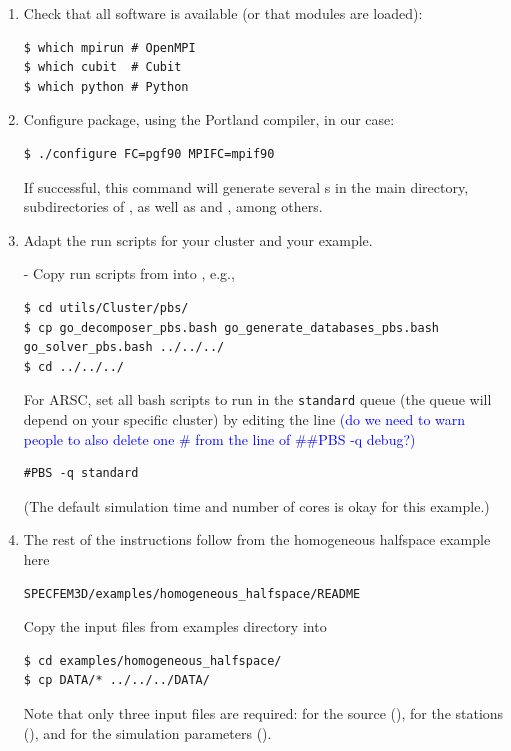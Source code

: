 \documentclass[10pt,fleqn,letterpaper]{article}
\newcommand{\blue}[1]{\textcolor{blue}{#1}}
\begin{document}
\begin{enumerate}
\item Check that all software is available (or that modules are loaded):
\begin{lstlisting}
$ which mpirun # OpenMPI
$ which cubit  # Cubit
$ which python # Python
\end{lstlisting}

\item Configure package, using the Portland compiler, in our case:
\begin{lstlisting}
$ ./configure FC=pgf90 MPIFC=mpif90
\end{lstlisting}

If successful, this command will generate several s in the  main directory, subdirectories of , as well as  and , among others.

\item Adapt the run scripts for your cluster and your example.

- Copy run scripts from  into , e.g.,
\begin{lstlisting}
$ cd utils/Cluster/pbs/
$ cp go_decomposer_pbs.bash go_generate_databases_pbs.bash go_solver_pbs.bash ../../../
$ cd ../../../
\end{lstlisting}

For ARSC, set all bash scripts to run in the \texttt{standard} queue (the queue will depend on your specific cluster) by editing the line
\blue{(do we need to warn people to also delete one \# from the line of \#\#PBS -q debug?)}
\begin{lstlisting}
#PBS -q standard
\end{lstlisting}
(The default simulation time and number of cores is okay for this example.)
 
\item The rest of the instructions follow from the homogeneous halfspace example here
\begin{lstlisting}
SPECFEM3D/examples/homogeneous_halfspace/README
\end{lstlisting}

Copy the input files from examples directory into 
\begin{lstlisting}
$ cd examples/homogeneous_halfspace/
$ cp DATA/* ../../../DATA/
\end{lstlisting}
%
Note that only three input files are required: for the source (), for the stations (), and for the simulation parameters ().


\end{enumerate}
\end{document}
